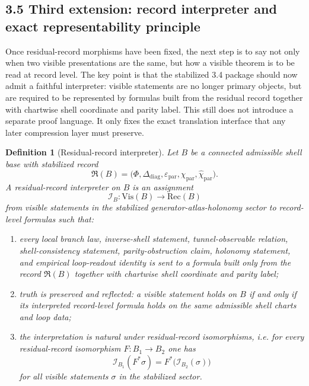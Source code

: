 \documentclass[12pt,a4paper]{article}
\newtheorem{definition}[theorem]{Definition}
\begin{document}
\subsection*{3.5 Third extension: record interpreter and exact representability principle}
Once residual-record morphisms have been fixed, the next step is to say not only when two visible presentations are the same, but how a visible theorem is to be read at record level. The key point is that the stabilized 3.4 package should now admit a faithful interpreter: visible statements are no longer primary objects, but are required to be represented by formulas built from the residual record together with chartwise shell coordinate and parity label. This still does not introduce a separate proof language. It only fixes the exact translation interface that any later compression layer must preserve.

\begin{definition}[Residual-record interpreter]
\label{def:mainline-3502}
Let $B$ be a connected admissible shell base with stabilized record
\[
 \mathfrak R(B)=\bigl(\Phi,\Delta_{\mathrm{diag}},\varepsilon_{\mathrm{par}},\chi_{\mathrm{par}},\widehat\chi_{\mathrm{par}}\bigr).
\]
A \emph{residual-record interpreter} on $B$ is an assignment
\[
 \mathcal I_B : \mathrm{Vis}(B) \longrightarrow \mathrm{Rec}(B)
\]
from visible statements in the stabilized generator-atlas-holonomy sector to record-level formulas such that:
\begin{enumerate}[label=(\roman*), leftmargin=2em]
 \item every local branch law, inverse-shell statement, tunnel-observable relation, shell-consistency statement, parity-obstruction claim, holonomy statement, and empirical loop-readout identity is sent to a formula built only from the record $\mathfrak R(B)$ together with chartwise shell coordinate and parity label;
 \item truth is preserved and reflected: a visible statement holds on $B$ if and only if its interpreted record-level formula holds on the same admissible shell charts and loop data;
 \item the interpretation is natural under residual-record isomorphisms, i.e. for every residual-record isomorphism $F:B_1\to B_2$ one has
 \[
 \mathcal I_{B_1}(F^*\sigma)=F^*\bigl(\mathcal I_{B_2}(\sigma)\bigr)
 \]
 for all visible statements $\sigma$ in the stabilized sector.
\end{enumerate}
\end{definition}
\end{document}
